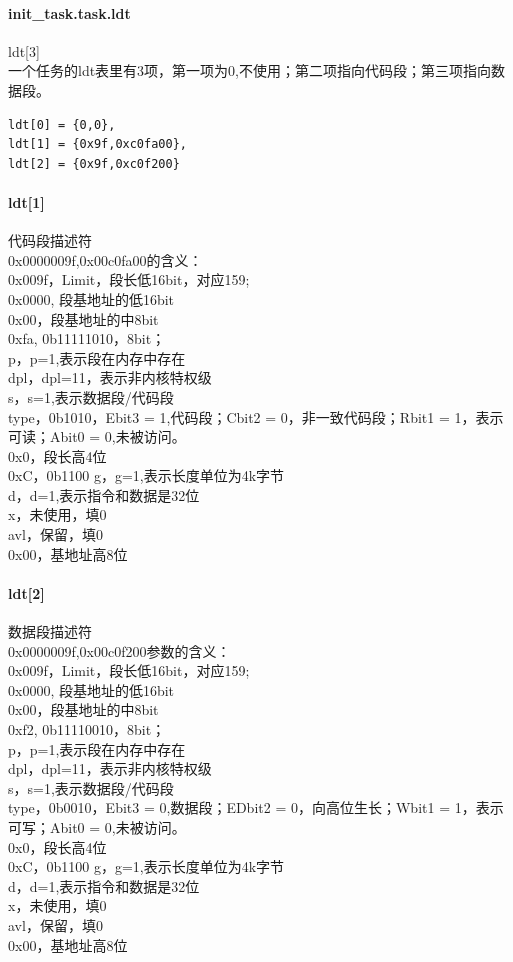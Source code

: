 \documentclass[12pt]{article}
\begin{document}
\paragraph{init\_task.task.ldt} ldt[3]\\
一个任务的ldt表里有3项，第一项为0,不使用；第二项指向代码段；第三项指向数据段。
\begin{lstlisting}[breaklines]
ldt[0] = {0,0},
ldt[1] = {0x9f,0xc0fa00},
ldt[2] = {0x9f,0xc0f200}
\end{lstlisting}
\paragraph{ldt[1]}代码段描述符\\
0x0000009f,0x00c0fa00的含义：\\
0x009f，Limit，段长低16bit，对应159;\\
0x0000, 段基地址的低16bit\\
0x00，段基地址的中8bit\\
0xfa, 0b11111010，8bit；\\
p，p=1,表示段在内存中存在\\
dpl，dpl=11，表示非内核特权级\\
s，s=1,表示数据段/代码段\\
type，0b1010，Ebit3 = 1,代码段；Cbit2 = 0，非一致代码段；Rbit1 = 1，表示可读；Abit0 = 0,未被访问。\\
0x0，段长高4位\\
0xC，0b1100
g，g=1,表示长度单位为4k字节\\
d，d=1,表示指令和数据是32位\\
x，未使用，填0\\
avl，保留，填0\\
0x00，基地址高8位
\paragraph{ldt[2]}数据段描述符\\
0x0000009f,0x00c0f200参数的含义：\\
0x009f，Limit，段长低16bit，对应159;\\
0x0000, 段基地址的低16bit\\
0x00，段基地址的中8bit\\
0xf2, 0b11110010，8bit；\\
p，p=1,表示段在内存中存在\\
dpl，dpl=11，表示非内核特权级\\
s，s=1,表示数据段/代码段\\
type，0b0010，Ebit3 = 0,数据段；EDbit2 = 0，向高位生长；Wbit1 = 1，表示可写；Abit0 = 0,未被访问。\\
0x0，段长高4位\\
0xC，0b1100
g，g=1,表示长度单位为4k字节\\
d，d=1,表示指令和数据是32位\\
x，未使用，填0\\
avl，保留，填0\\
0x00，基地址高8位
\end{document}
